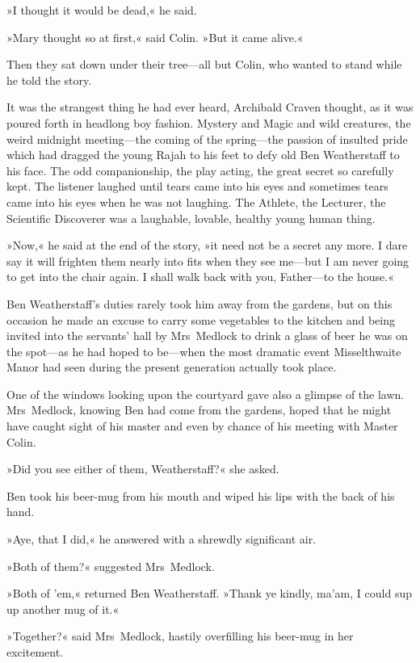 »I thought it would be dead,« he said.

»Mary thought so at first,« said Colin. »But it came alive.«

Then they sat down under their tree—all but Colin, who wanted to stand while he told the story.

It was the strangest thing he had ever heard, Archibald Craven thought, as it was poured forth in headlong boy fashion. Mystery and Magic and wild creatures, the weird midnight meeting—the coming of the spring—the passion of insulted pride which had dragged the young Rajah to his feet to defy old Ben Weatherstaff to his face. The odd companionship, the play acting, the great secret so carefully kept. The listener laughed until tears came into his eyes and sometimes tears came into his eyes when he was not laughing. The Athlete, the Lecturer, the Scientific Discoverer was a laughable, lovable, healthy young human thing.

»Now,« he said at the end of the story, »it need not be a secret any more. I dare say it will frighten them nearly into fits when they see me—but I am never going to get into the chair again. I shall walk back with you, Father—to the house.«

Ben Weatherstaff's duties rarely took him away from the gardens, but on this occasion he made an excuse to carry some vegetables to the kitchen and being invited into the servants' hall by Mrs~Medlock to drink a glass of beer he was on the spot—as he had hoped to be—when the most dramatic event Misselthwaite Manor had seen during the present generation actually took place.

One of the windows looking upon the courtyard gave also a glimpse of the lawn. Mrs~Medlock, knowing Ben had come from the gardens, hoped that he might have caught sight of his master and even by chance of his meeting with Master Colin.

»Did you see either of them, Weatherstaff?« she asked.

Ben took his beer-mug from his mouth and wiped his lips with the back of his hand.

»Aye, that I did,« he answered with a shrewdly significant air.

»Both of them?« suggested Mrs~Medlock.

»Both of 'em,« returned Ben Weatherstaff. »Thank ye kindly, ma'am, I could sup up another mug of it.«

»Together?« said Mrs~Medlock, hastily overfilling his beer-mug in her excitement.

